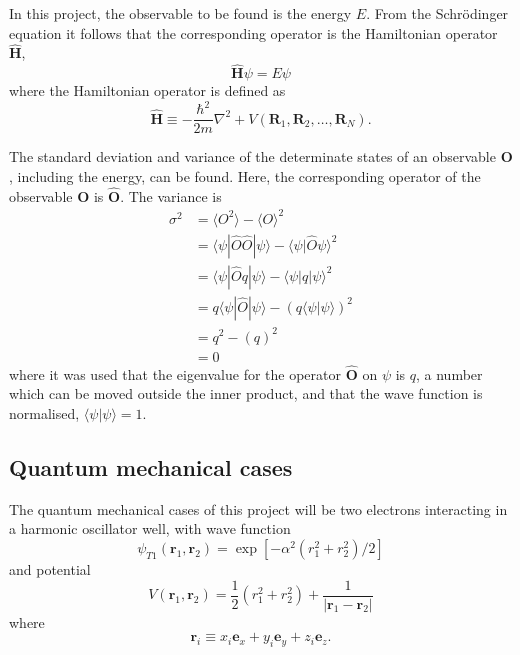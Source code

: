 \documentclass[a4paper,11pt]{article}
\begin{document}
In this project, the observable to be found is the energy $E$. From the Schr\"odinger equation it follows that the corresponding operator is the Hamiltonian operator $\hat{\mathbf{H}}$,
\begin{equation}
    \hat{\mathbf{H}} \psi = E \psi
    \label{eq:schrodinger}
\end{equation}
where the Hamiltonian operator is defined as
\begin{equation}
    \hat{\mathbf{H}}    \equiv  -\frac{\hbar^2}{2m} \nabla^2 + V(\mathbf{R}_1, \mathbf{R}_2, \dots, \mathbf{R}_N).
    \label{eq:hamiltonian}
\end{equation}

The standard deviation and variance of the determinate states of an observable $\mathbf{O}$, including the energy, can be found. Here, the corresponding operator of the observable $\mathbf{O}$ is $\hat{\mathbf{O}}$. The variance is
\begin{align*}
    \sigma^2 &= \langle O^2 \rangle - \langle O \rangle^2 \\
    &=  \langle \psi | \hat{O} \hat{O} | \psi \rangle - \langle \psi | \hat{O} \psi \rangle^2 \\
    &=  \langle \psi | \hat{O} q | \psi \rangle - \langle \psi | q | \psi \rangle^2 \\
    &= q \langle \psi | \hat{O} | \psi \rangle - \left( q \langle \psi | \psi \rangle \right)^2 \\
    &= q^2 - \left( q \right)^2 \\
    &= 0
\end{align*}
where it was used that the eigenvalue for the operator $\hat{\mathbf{O}}$ on $\psi$ is $q$, a number which can be moved outside the inner product, and that the wave function is normalised, $\langle \psi | \psi \rangle = 1$.

\subsection{Quantum mechanical cases}
The quantum mechanical cases of this project will be two electrons interacting in a harmonic oscillator well, with wave function
\begin{equation}
    \psi_{T1}(\mathbf{r}_1, \mathbf{r}_2) = \exp \left[ -\alpha^2 \left( r_1^2 + r_2^2  \right)/2 \right]
    \label{eq:wavefuncT1}
\end{equation}
and potential
\begin{equation}
    V(\mathbf{r}_1, \mathbf{r}_2) = \frac{1}{2} \left( r_1^2 + r_2^2 \right) + \frac{1}{|\mathbf{r}_1 - \mathbf{r}_2 | }
    \label{eq:potential}
\end{equation}
where 
\[ \mathbf{r}_i \equiv x_i \mathbf{e}_x + y_i \mathbf{e}_y + z_i \mathbf{e}_z. \]
\end{document}
